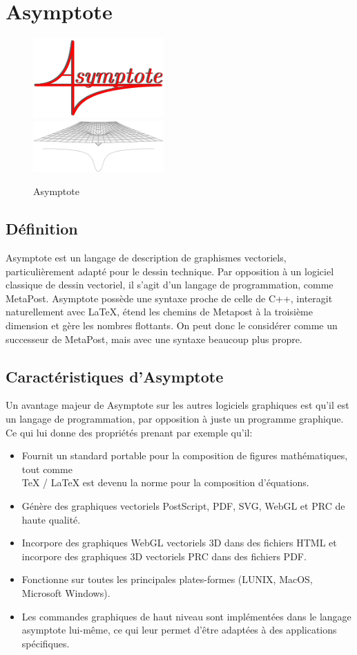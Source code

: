 \documentclass[a4paper]{report}
\begin{document}
\section{Asymptote}
    \begin{figure}[!h] \centering
        \includegraphics[width=5cm]{images/asylogo.png}\\
        \includegraphics[width=5cm]{images/asyfonction.png}
        \caption{Asymptote} \label{Asymptote} 
    \end{figure}
\subsection{Définition}
Asymptote est un langage de description de graphismes vectoriels, particulièrement adapté pour le dessin technique. Par opposition à un logiciel classique de dessin vectoriel, il s'agit d'un langage de programmation, comme MetaPost. Asymptote possède une syntaxe proche de celle de C++, interagit naturellement avec LaTeX, étend les chemins de Metapost à la troisième dimension et gère les nombres flottants. On peut donc le considérer comme un successeur de MetaPost, mais avec une syntaxe beaucoup plus propre.
\subsection{Caractéristiques d'Asymptote}
Un avantage majeur de Asymptote sur les autres logiciels graphiques est qu'il est un langage de programmation, par opposition à juste un programme graphique. Ce qui lui donne des propriétés prenant par exemple qu'il: 
\begin{itemize}
\item Fournit un standard portable pour la composition de figures mathématiques, tout comme\\  TeX / LaTeX est devenu la norme pour la composition d'équations.
\item Génère des graphiques vectoriels PostScript, PDF, SVG, WebGL et PRC de haute qualité.
\item Incorpore des graphiques WebGL vectoriels 3D dans des fichiers HTML et incorpore des graphiques   3D vectoriels PRC dans des fichiers PDF.
\item Fonctionne sur toutes les principales plates-formes (LUNIX, MacOS, Microsoft Windows).
\item Les commandes graphiques de haut niveau sont implémentées dans le langage asymptote lui-même, ce qui leur permet d'être adaptées à des applications spécifiques.
\end{itemize}
\newpage
\end{document}
